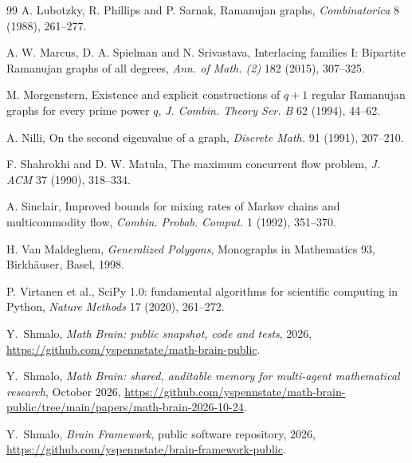 \documentclass[11pt]{amsart}
\theoremstyle{definition}
\begin{document}
\begin{thebibliography}{99}
 A. Lubotzky, R. Phillips and P. Sarnak, Ramanujan graphs, \emph{Combinatorica} 8 (1988), 261--277.

 A. W. Marcus, D. A. Spielman and N. Srivastava, Interlacing families I: Bipartite Ramanujan graphs of all degrees, \emph{Ann. of Math. (2)} 182 (2015), 307--325.

 M. Morgenstern, Existence and explicit constructions of $q+1$ regular Ramanujan graphs for every prime power $q$, \emph{J. Combin. Theory Ser. B} 62 (1994), 44--62.

 A. Nilli, On the second eigenvalue of a graph, \emph{Discrete Math.} 91 (1991), 207--210.

 F. Shahrokhi and D. W. Matula, The maximum concurrent flow problem, \emph{J. ACM} 37 (1990), 318--334.

 A. Sinclair, Improved bounds for mixing rates of Markov chains and multicommodity flow, \emph{Combin. Probab. Comput.} 1 (1992), 351--370.

 H. Van Maldeghem, \emph{Generalized Polygons}, Monographs in Mathematics 93, Birkh\"auser, Basel, 1998.

 P. Virtanen et al., SciPy 1.0: fundamental algorithms for scientific computing in Python, \emph{Nature Methods} 17 (2020), 261--272.

 Y.~Shmalo, \emph{Math Brain: public snapshot, code and tests}, 2026, \url{https://github.com/yspennstate/math-brain-public}.

 Y.~Shmalo, \emph{Math Brain: shared, auditable memory for multi-agent mathematical research}, October 2026, \url{https://github.com/yspennstate/math-brain-public/tree/main/papers/math-brain-2026-10-24}.

 Y.~Shmalo, \emph{Brain Framework}, public software repository, 2026, \url{https://github.com/yspennstate/brain-framework-public}.

\end{thebibliography}
\end{document}
